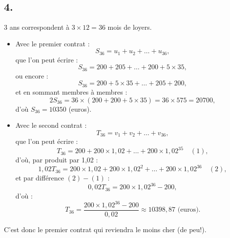 \documentclass[10pt]{article}
\begin{document}
\subsection*{4.}

3 ans correspondent à \( 3 \times 12 = 36 \) mois de loyers.

\begin{itemize}
    \item Avec le premier contrat :
    \[
    S_{36} = u_1 + u_2 + \dots + u_{36},
    \]
    que l'on peut écrire :
    \[
    S_{36} = 200 + 205 + \dots + 200 + 5 \times 35,
    \]
    ou encore :
    \[
    S_{36} = 200 + 5 \times 35 + \dots + 205 + 200,
    \]
    et en sommant membres à membres :
    \[
    2S_{36} = 36 \times (200 + 200 + 5 \times 35) = 36 \times 575 = 20700,
    \]
   	d'où \(S_{36} = 10350\) (euros).

    \item Avec le second contrat :
    \[
    T_{36} = v_1 + v_2 + \dots + v_{36},
    \]
    que l'on peut écrire :
    \[
    T_{36} = 200 + 200 \times 1{,}02 + \dots + 200 \times 1{,}02^{35} \quad (1),
    \]
    d'où, par produit par 1{,}02 :
    \[
    1{,}02 T_{36} = 200 \times 1{,}02 + 200 \times 1{,}02^2 + \dots + 200 \times 1{,}02^{36} \quad (2),
    \]
    et par différence \((2) - (1)\) :
    \[
    0{,}02 T_{36} = 200 \times 1{,}02^{36} - 200,
    \]
    d'où :
    \[
    T_{36} = \dfrac{200 \times 1{,}02^{36} - 200}{0{,}02} \approx 10398{,}87 \text{ (euros)}.
    \]
\end{itemize}

C'est donc le premier contrat qui reviendra le moins cher (de peu!).
\end{document}
